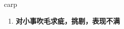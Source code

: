 
\begin{frame}
{\huge carp}
\begin{center}
\begin{enumerate}\Large
  \item \textbf{对小事吹毛求疵，挑剔，表现不满}
\end{enumerate}
\end{center}
\end{frame}
